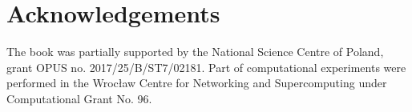%
%


\chapter*{Acknowledgements}

The book was partially supported by the National Science Centre of Poland, grant OPUS no. 2017/25/B/ST7/02181. Part of computational experiments were performed in the Wrocław Centre for Networking and Supercomputing under Computational Grant No. 96.


